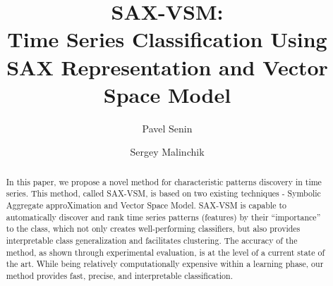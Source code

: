 \documentclass{llncs}
\begin{document}
%
\mainmatter              %
%
\title{SAX-VSM: \\Time Series Classification Using SAX Representation and Vector Space Model}
%
%
\author{Pavel Senin
\and Sergey Malinchik
}
%
%
%


\maketitle              %

\begin{abstract}
In this paper, we propose a novel method for characteristic patterns discovery in 
time series. This method, called SAX-VSM, is based on two existing techniques - 
Symbolic Aggregate approXimation and Vector Space Model. SAX-VSM is capable 
to automatically discover and rank time series patterns (features) by their 
“importance” to the class, which not only creates well-performing classifiers, 
but also provides interpretable class generalization and facilitates clustering. 
The accuracy of the method, as shown through experimental evaluation, is at the 
level of a current state of the art. 
While being relatively computationally expensive within a learning phase, 
our method provides fast, precise, and interpretable classification.
\end{abstract}
%
\end{document}
